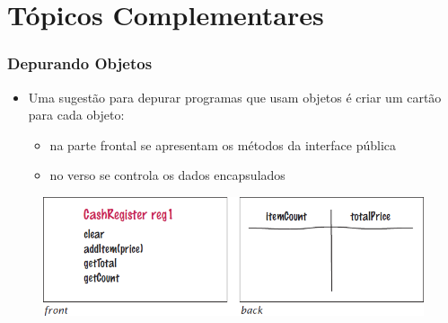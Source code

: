 \documentclass[xcolor={dvipsnames,table},aspectratio=169]{beamer}
\begin{document}
\section{Tópicos Complementares}

\begin{frame}\frametitle{Depurando Objetos}
\begin{itemize}
	\item Uma sugestão para depurar programas que usam objetos é criar um cartão para cada objeto:
	\begin{itemize}
		\item na parte frontal se apresentam os métodos da interface pública
		\item no verso se controla os dados encapsulados
	\end{itemize}
\end{itemize}
\begin{figure}[h]
	\includegraphics[height=0.40\paperheight,center]{pucrs-ep-fprog-unidade_07-objetos_e_classes-laminas-depurando_objetos.png}
\end{figure}
\end{frame}
\end{document}
